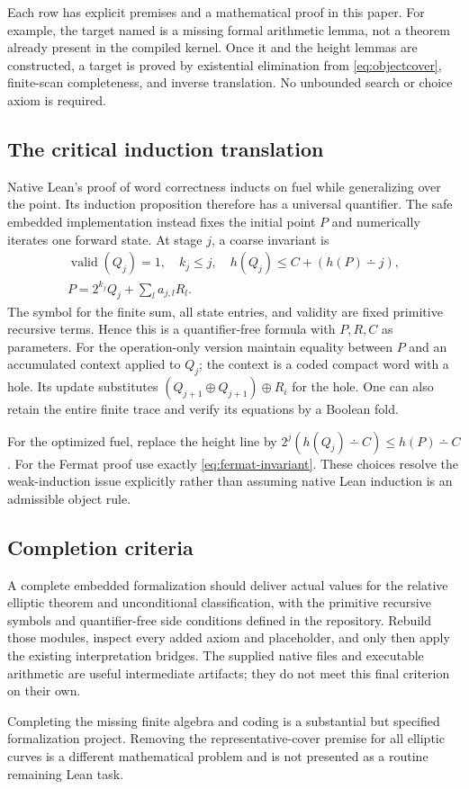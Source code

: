 Each row has explicit premises and a mathematical proof in this paper.
For example, the target named  is a missing
formal arithmetic lemma, not a theorem already present in the compiled
kernel. Once it and the height lemmas are constructed, a target
 is proved by existential elimination
from \eqref{eq:objectcover}, finite-scan completeness, and inverse
translation. No unbounded search or choice axiom is required.

\subsection{The critical induction translation}

Native Lean's proof of word correctness inducts on fuel while generalizing
over the point. Its induction proposition therefore has a universal
quantifier. The safe embedded implementation instead fixes the initial
point $P$ and numerically iterates one forward state. At stage $j$, a
coarse invariant is
\[
\begin{gathered}
 \operatorname{valid}(Q_j)=1,\quad k_j\le j,\quad
 h(Q_j)\le C+(h(P)\dotminus j),\\
 P=2^{k_j}Q_j+\sum_l a_{j,l}R_l .
\end{gathered}
\tag{7.5}\label{eq:embedded-invariant}
\]
The symbol for the finite sum, all state entries, and validity are fixed
primitive recursive terms. Hence this is a quantifier-free formula with
$P,R,C$ as parameters. For the operation-only version maintain equality
between $P$ and an accumulated context applied to $Q_j$; the context is
a coded compact word with a hole. Its update substitutes
$(Q_{j+1}\oplus Q_{j+1})\oplus R_i$ for the hole.
One can also retain the entire finite trace and verify its equations by a
Boolean fold.

For the optimized fuel, replace the height line by
$2^j(h(Q_j)\dotminus C)\le h(P)\dotminus C$.
For the Fermat proof use exactly \eqref{eq:fermat-invariant}.
These choices resolve the weak-induction issue explicitly rather than
assuming native Lean induction is an admissible object rule.

\subsection{Completion criteria}

A complete embedded formalization should deliver actual 
values for the relative elliptic theorem and unconditional classification,
with the primitive recursive symbols and quantifier-free side conditions
defined in the repository. Rebuild those modules, inspect every added axiom
and placeholder, and only then apply the existing interpretation bridges.
The supplied native files and executable arithmetic are useful intermediate
artifacts; they do not meet this final criterion on their own.

Completing the missing finite algebra and coding is a substantial but
specified formalization project. Removing the representative-cover premise
for all elliptic curves is a different mathematical problem and is not
presented as a routine remaining Lean task.
